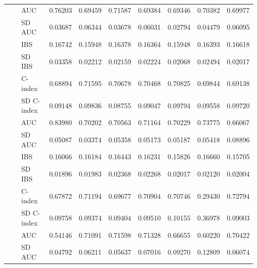 \begin{table}[ht]
\begin{tabular}{
>{\centering\arraybackslash}p{2.8cm}
>{\centering\arraybackslash}p{1.4cm}
>{\centering\arraybackslash}p{1.5cm}
ccccccc
}
&
& AUC
& 0.76203
& 0.69459
& 0.71587
& 0.69384
& 0.69346
& 0.70382
& 0.69977 \\

&
& SD AUC
& 0.03687
& 0.06344
& 0.03678
& 0.06031
& 0.02794
& 0.04479
& 0.06095 \\

\midrule

\multirow{6}{*}{Bernoulli}
& \multirow{6}{*}{291.26}
& IBS
& 0.16742
& 0.15948
& 0.16378
& 0.16364
& 0.15948
& 0.16393
& 0.16618 \\

&
& SD IBS
& 0.03358
& 0.02212
& 0.02159
& 0.02224
& 0.02068
& 0.02494
& 0.02017 \\

&
& C-index
& 0.68894
& 0.71595
& 0.70678
& 0.70468
& 0.70825
& 0.69844
& 0.69138 \\

&
& SD C-index
& 0.09148
& 0.09836
& 0.08755
& 0.09047
& 0.09794
& 0.09558
& 0.09720 \\

&
& AUC
& 0.83980
& 0.70202
& 0.70563
& 0.71164
& 0.70229
& 0.73775
& 0.66067 \\

&
& SD AUC
& 0.05087
& 0.03374
& 0.05358
& 0.05173
& 0.05187
& 0.05418
& 0.08896 \\

\midrule

\multirow{6}{*}{Binomial}
& \multirow{6}{*}{86.60}
& IBS
& 0.16066
& 0.16184
& 0.16443
& 0.16231
& 0.15826
& 0.16660
& 0.15705 \\

&
& SD IBS
& 0.01896
& 0.01983
& 0.02368
& 0.02268
& 0.02017
& 0.02120
& 0.02004 \\

&
& C-index
& 0.67872
& 0.71194
& 0.69677
& 0.70904
& 0.70746
& 0.29430
& 0.72794 \\

&
& SD C-index
& 0.09758
& 0.09374
& 0.09404
& 0.09510
& 0.10155
& 0.36978
& 0.09003 \\

&
& AUC
& 0.54146
& 0.71091
& 0.71598
& 0.71328
& 0.66655
& 0.60220
& 0.70422 \\

&
& SD AUC
& 0.04792
& 0.06211
& 0.05637
& 0.07016
& 0.09270
& 0.12809
& 0.06074 \\

\bottomrule
\end{tabular}
\end{table}

